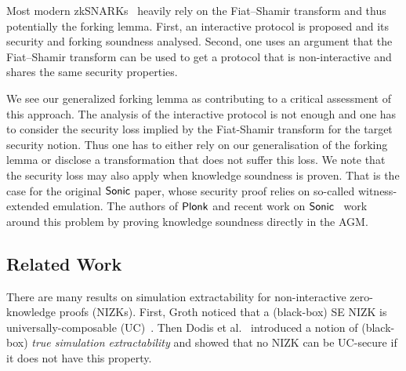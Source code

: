 Most modern zkSNARKs~\cite{SP:BBBPWM18,CCS:MBKM19} heavily
rely on the Fiat--Shamir transform and thus potentially the forking lemma. First, an interactive
protocol is proposed and its security and forking soundness analysed. Second,
one uses an argument that the Fiat--Shamir transform can be used to get a
protocol that is non-interactive and shares the same security properties.

We see our generalized forking lemma as contributing to a critical assessment of
this approach. The analysis of the interactive protocol is not enough and one
has to consider the security loss implied by the Fiat-Shamir transform for the target security notion. Thus one has to either rely on our generalisation of the forking
lemma or disclose a transformation that does not suffer this loss. We note that
the security loss may also apply when knowledge soundness is proven. That is the
case for the original ${\textnormal{\textsf{Sonic}}}$ paper, whose security proof relies on so-called witness-extended
emulation. The authors of $\textnormal{\textsf{Plonk}}$ and recent work on ${\textnormal{\textsf{Sonic}}}$~\cite{cryptoeprint:2020:1351} work around this problem by proving
knowledge soundness directly in the AGM.



\subsection{Related Work}
%
%

There are many results on simulation extractability for
non-interactive zero-knowledge proofs (NIZKs). First, Groth \cite{AC:Groth07}
noticed that a (black-box) SE NIZK is
universally-composable (UC)~\cite{EPRINT:Canetti00}. Then Dodis et al.~\cite{AC:DHLW10} introduced a
notion of (black-box) \emph{true simulation extractability} and showed that no
NIZK can be UC-secure if it does not have this property. 

